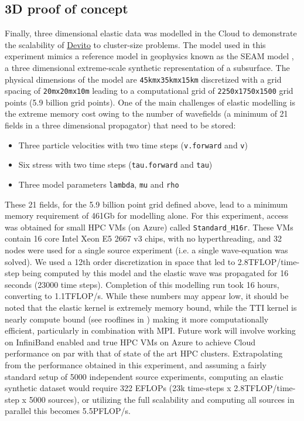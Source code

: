 \documentclass[10pt, conference]{IEEEtran}
\newcommand{\devito}{\href{https://github.com/devitocodes/devito}{Devito} }
\begin{document}
\subsection{3D proof of concept}\label{d-proof-of-concept}

Finally, three dimensional elastic data was modelled in the Cloud to
demonstrate the scalability of \devito to cluster-size problems. The model
used in this experiment mimics a reference model in geophysics known as
the SEAM model \cite{fehler2011seam}, a three dimensional extreme-scale
synthetic representation of a subsurface. The physical dimensions of the
model are \texttt{45kmx35kmx15km} discretized with a grid spacing of
\texttt{20mx20mx10m} leading to a computational grid of
\texttt{2250x1750x1500} grid points (5.9 billion grid points). One of the
main challenges of elastic modelling is the extreme memory cost owing to
the number of wavefields (a minimum of 21 fields in a three dimensional
propagator) that need to be stored:

\begin{itemize}
\itemsep1pt\parskip0pt
\item
  Three particle velocities with two time steps (\texttt{v.forward} and
  \texttt{v})
\item
  Six stress with two time steps (\texttt{tau.forward} and \texttt{tau})
\item
  Three model parameters \texttt{lambda}, \texttt{mu} and \texttt{rho}
\end{itemize}

These 21 fields, for the 5.9 billion point grid defined above, lead to a
minimum memory requirement of 461Gb for modelling alone. For this experiment,
access was obtained for small HPC VMs (on Azure) called \texttt{Standard\_H16r}.
These VMs contain 16 core Intel Xeon E5 2667 v3 chips, with no hyperthreading,
and 32 nodes were used for a single source experiment
(i.e. a single wave-equation was solved). We
used a 12th order discretization in space that led to 2.8TFLOP/time-step being
computed by this model and the elastic wave was propagated for 16 seconds
(23000 time steps). Completion of this modelling run took 16 hours, converting to
1.1TFLOP/s. While these numbers may appear low, it should be noted that
the elastic kernel is extremely memory bound, while the TTI kernel is nearly
compute bound (see rooflines in \cite{louboutin2016ppf, devito-api, devito-compiler})
making it more computationally efficient, particularly in combination
with MPI. Future work will involve working on InfiniBand enabled and
true HPC VMs on Azure to achieve Cloud performance on par with that of state of
the art HPC clusters. Extrapolating from the performance obtained in this
experiment, and assuming a fairly standard setup of 5000 independent
source experiments, computing an elastic synthetic dataset would require 322
EFLOPs (23k time-steps x 2.8TFLOP/time-step x 5000
sources), or utilizing the full scalability and computing all sources in
parallel this becomes 5.5PFLOP/s.
\end{document}

